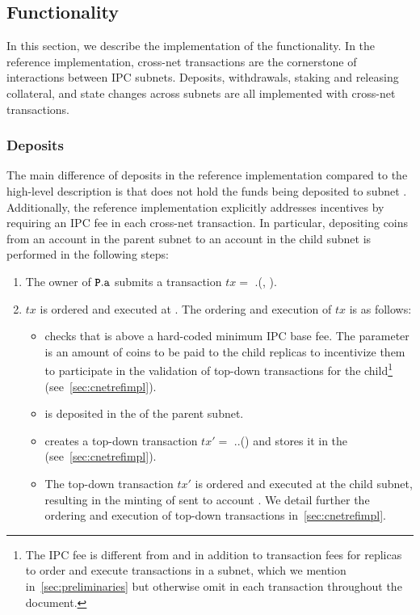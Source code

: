 \subsection{Functionality} 
\label{sec:refimplfunc}
In this section, we describe the implementation of the functionality. In the reference implementation, cross-net transactions are the cornerstone of interactions between IPC subnets. Deposits, withdrawals, staking and releasing collateral, and state changes across subnets are all implemented with cross-net transactions.

\subsubsection{Deposits}
The main difference of deposits in the reference implementation compared to the high-level description is that  does not hold the funds being deposited to subnet . Additionally, the reference implementation explicitly addresses incentives by requiring an IPC fee in each cross-net transaction. In particular, depositing  coins from an account  in the parent subnet  to an account  in the child subnet  is performed in the following steps:

\begin{enumerate}
    \item The owner of $\textbf{\texttt{P}}.\texttt{a}$ submits a transaction $tx=$ \gw.(, ).
    \item $tx$ is ordered and executed at . The ordering and execution of $tx$ is as follows:
    \begin{itemize}
        \item \gw checks that  is above a hard-coded minimum IPC base fee. The parameter  is an amount of coins to be paid to the child replicas to incentivize them to participate in the validation of top-down transactions for the child\footnote{The IPC fee is different from and in addition to transaction fees for replicas to order and execute transactions in a subnet, which we mention in~\cref{sec:preliminaries} but otherwise omit in each transaction throughout the document.} (see~\cref{sec:cnetrefimpl}). 
        \item {} is deposited in the \gw of the parent subnet.
        \item \gw creates a top-down transaction $tx'=$ .\gw.() and stores it in the \tqueue (see~\cref{sec:cnetrefimpl}).
        \item The top-down transaction $tx'$ is ordered and executed at the child subnet, resulting in the minting of  sent to account . We detail further the ordering and execution of top-down transactions in~\cref{sec:cnetrefimpl}.
    \end{itemize}
\end{enumerate}

